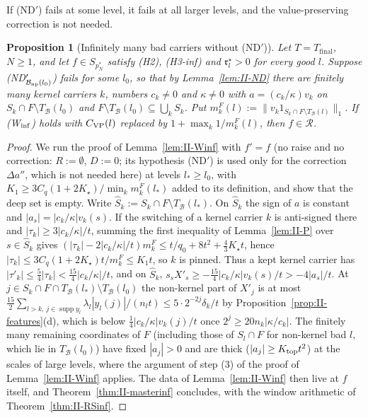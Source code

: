 \documentclass[10pt]{amsart}
\newtheorem{proposition}[theorem]{Proposition}
\theoremstyle{definition}
\theoremstyle{remark}
\newcommand{\supp}{\operatorname{supp}}
\newcommand{\Rec}{\mathcal R}
\begin{document}
If (ND$'$) fails at some level, it fails at all larger levels, and the
value-preserving correction is not needed.

\begin{proposition}[Infinitely many bad carriers without (ND$'$)]
\label{prop:II-kernel}
Let $T=T_{\mathrm{final}}$, $N\ge1$, and let $f\in S_{p_N^*}$ satisfy
\textup{(H2)}, \textup{(H3-inf)} and $\mathfrak r^\star_l>0$ for every good
$l$.  Suppose \textup{(ND$'_{\mathcal B_{\rm np}(l_0)}$)} fails for some
$l_0$, so that by Lemma~\textup{\ref{lem:II-ND}} there are finitely many
\emph{kernel carriers} $k$, numbers $c_k\ne0$ and $\kappa\ne0$ with
$a=(c_k/\kappa)v_k$ on $S_k\cap F\setminus T_{\mathcal B}(l_0)$ and
$F\setminus T_{\mathcal B}(l_0)\subseteq\bigcup_kS_k$.  Put
$m^F_k(l):=\|v_k1_{S_k\cap F\setminus T_{\mathcal B}(l)}\|_1$.  If
\textup{(W$_{\rm inf}$)} holds with $C_{\rm VP}(l)$ replaced by
$1+\max_k1/m^F_k(l)$, then $f\in\Rec$.
\end{proposition}

\begin{proof}
We run the proof of Lemma~\ref{lem:II-Winf} with $f'=f$ (no raise and no
correction: $R:=\emptyset$, $D:=0$; its hypothesis (ND$'$) is used only for
the correction $\Delta a''$, which is not needed here) at levels $l_*\ge l_0$, with
$K_1\ge3C_q(1+2K_\star)/\min_km^F_k(l_*)$ added to its definition, and
show that the deep set is empty.  Write $\hat S_k:=S_k\cap F\setminus
T_{\mathcal B}(l_*)$.  On $\hat S_k$ the sign of $a$ is constant and
$|a_s|=|c_k/\kappa|v_k(s)$.  If the switching of a kernel carrier $k$ is
anti-signed there and $|\tau_k|\ge3|c_k/\kappa|/t$, summing the first
inequality of Lemma~\ref{lem:II-P} over $s\in\hat S_k$ gives
$(|\tau_k|-2|c_k/\kappa|/t)m^F_k\le t/q_0+8t^2+\frac43K_\star t$, hence
$|\tau_k|\le3C_q(1+2K_\star)t/m^F_k\le K_1t$, so $k$ is pinned.  Thus a kept
kernel carrier has $|\tau'_k|\le\frac54|\tau_k|<\frac{15}4|c_k/\kappa|/t$, and on
$\hat S_k$, $s_sX'_s\ge-\frac{15}4|c_k/\kappa|v_k(s)/t>-4|a_s|/t$.  At
$j\in S_k\cap F\cap T_{\mathcal B}(l_*)\setminus T_{\mathcal B}(l_0)$ the
non-kernel part of $X'_j$ is at most $\frac{15}2\sum_{l>k,\,j\in\supp y_l}
\lambda_l|y_l(j)|/(n_lt)\le5\cdot2^{-2j}\delta_k/t$ by
Proposition~\ref{prop:II-features}(d), which is below
$\frac14|c_k/\kappa|v_k(j)/t$ once $2^j\ge20n_k|\kappa/c_k|$.  The finitely many
remaining coordinates of $F$ (including those of $S_l\cap F$ for non-kernel
bad $l$, which lie in $T_{\mathcal B}(l_0)$) have fixed $|a_j|>0$ and are
thick ($|a_j|\ge K_{\rm top}t^2$) at the scales of large levels, where the
argument of step (3) of the proof of Lemma~\ref{lem:II-Winf} applies.  The
data of Lemma~\ref{lem:II-Winf} then live at $f$ itself, and
Theorem~\ref{thm:II-masterinf} concludes, with the window arithmetic of
Theorem~\ref{thm:II-RSinf}.
\end{proof}
\end{document}
